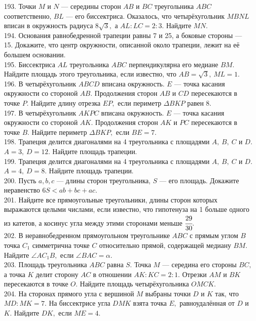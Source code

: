193. Точки $M$ и $N$ --- середины сторон $AB$ и $BC$ треугольника $ABC$ соответственно, $BL$ --- его биссектриса. Оказалось, что четырёхугольник $MBNL$ вписан в окружность радиуса $8\sqrt{3},$ а $AL:LC=2:3.$ Найдите $MN.$\\
194. Основания равнобедренной трапеции равны 7 и 25, а боковые стороны --- 15. Докажите, что центр окружности, описанной около трапеции, лежит на её большем основании.\\
195. Биссектриса $AL$ треугольника $ABC$ перпендикулярна его медиане $BM.$ Найдите площадь этого треугольника, если известно, что $AB=\sqrt{3},\ ML=1.$\\
196. В четырёхугольник $ABCD$ вписана окружность. $E$ --- точка касания окружности со стороной $AB.$ Продолжения сторон $AB$ и $CD$ пересекаются в точке $P.$ Найдите длину отрезка $EP,$ если периметр $\Delta BKP$ равен 8.\\
197. В четырёхугольник $AKPC$ вписана окружность. $E$ --- точка касания окружности со стороной $AK.$ Продолжения сторон $AK$ и $PC$ пересекаются в точке $B.$ Найдите периметр $\Delta BKP,$ если $BE=7.$\\
198. Трапеция делится диагоналями на 4 треугольника с площадями $A,\ B,\ C$ и $D.$ $A=3,\ D=12.$ Найдите площадь трапеции.\\
199. Трапеция делится диагоналями на 4 треугольника с площадями $A,\ B,\ C$ и $D.$ $A=4,\ D=8.$ Найдите площадь трапеции.\\
200. Пусть $a,b,c$ --- длины сторон треугольника, $S$ --- его площадь. Докажите неравенство $6S<ab+bc+ac.$\\
201. Найдите все прямоугольные треугольники, длины сторон которых выражаются целыми числами, если известно, что гипотенуза на 1 больше одного из катетов, а косинус угла между этими сторонами меньше $\cfrac{29}{30}.$\\
202. В неравнобедренном прямоугольном треугольнике $ABC$ с прямым углом $B$ точка $C_1$ симметрична точке $C$ относительно прямой, содержащей медиану $BM.$ Найдите $\angle AC_1B,$ если $\angle BAC=\alpha.$\\
203. Площадь треугольника $ABC$ равна $S.$ Точка $M$ --- середина его стороны $BC,$ а точка $K$ делит сторону $AC$ в отношении $AK:KC=2:1.$ Отрезки $AM$ и $BK$ пересекаются в точке $O.$ Найдите площадь четырёхугольника $OMCK.$\\
204. На сторонах прямого угла с вершиной $M$ выбраны точки $D$ и $K$ так, что $MD : MK = 7.$ На
биссектрисе угла $DMK$ взята точка $E,$ равноудалённая от $D$ и $K.$ Найдите $DK,$ если $ME = 4.$\\
